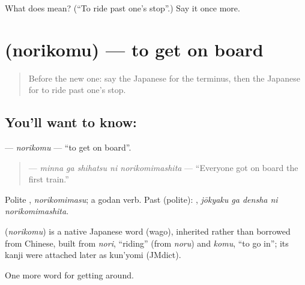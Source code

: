 \begin{tcolorbox}[breakable,colback=teal!4,colframe=teal!35!black,title={Before you move on}]
What does  mean? (\textquotedblleft{}To ride past one's stop\textquotedblright{}.) Say it once more.
\end{tcolorbox}
\section[\texorpdfstring{\ja{のりこむ} (norikomu)}{のりこむ (norikomu)}]{ (norikomu) — to get on board}

\label{lesson:JA-C375-norikomu}



\begin{quote}
Before the new one: say the Japanese for the terminus, then the Japanese for to ride past one's stop.
\end{quote}

\subsection*{You'll want to know: }
\textbf{} — \emph{norikomu} — \textquotedblleft{}to get on board\textquotedblright{}.

\begin{quote}
\textbf{  } — \emph{minna ga shihatsu ni norikomimashita} — \textquotedblleft{}Everyone got on board the first train.\textquotedblright{}
\end{quote}

Polite \textbf{}, \emph{norikomimasu}; a godan verb. Past (polite): \textbf{  }, \emph{jōkyaku ga densha ni norikomimashita}.

\begin{cousinweb}
\textbf{} (\emph{norikomu}) is a native Japanese word (wago), inherited rather than borrowed from Chinese, built from \emph{nori}, \textquotedblleft{}riding\textquotedblright{} (from \emph{noru}) and \emph{komu}, \textquotedblleft{}to go in\textquotedblright{}; its kanji were attached later as kun'yomi (JMdict).
\end{cousinweb}

\begin{grammarlens}[title={What you've built}]
One more word for getting around.
\end{grammarlens}

